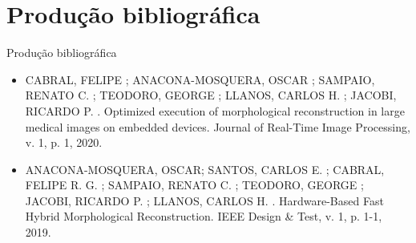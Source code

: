 \documentclass[aspectratio=169]{beamer}
\begin{document}
\section{Produção bibliográfica}


\begin{frame}{Produção bibliográfica}
	
	
	\begin{itemize}
	\justifying
	
	\item CABRAL, FELIPE ; ANACONA-MOSQUERA, OSCAR ; SAMPAIO, RENATO C. ; TEODORO, GEORGE ; LLANOS, CARLOS H. ; JACOBI, RICARDO P. . Optimized execution of morphological reconstruction in large medical images on embedded devices. Journal of Real-Time Image Processing, v. 1, p. 1, 2020. 			
	
	\item ANACONA-MOSQUERA, OSCAR; SANTOS, CARLOS E. ; CABRAL, FELIPE R. G. ; SAMPAIO, RENATO C. ; TEODORO, GEORGE ; JACOBI, RICARDO P. ; LLANOS, CARLOS H. . Hardware-Based Fast Hybrid Morphological Reconstruction. IEEE Design \& Test, v. 1, p. 1-1, 2019. 
	
	
	
	
	\end{itemize}
	
\end{frame}
\end{document}
